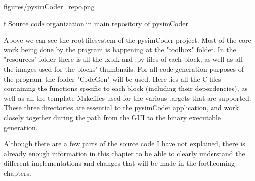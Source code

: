 \medskip {}
\picw=12cm \cinspic figures/pysimCoder_repo.png
\caption/f Source code organization in main repository of pysimCoder
\medskip

\quad Above we can see the root filesystem of the pysimCoder project. Most of the core work being done by the program is
happening at the "toolbox" folder. In the "resources" folder there is all the .xblk and .py files of each block, as well as
all the images used for the blocks' thumbnails. For all code generation purposes of the program, the folder "CodeGen" will be
used. Here lies all the C files containing the functions specific to each block (including their dependencies), as well
as all the template Makefiles used for the various targets that are supported. These three directories are essential to the
pysimCoder application, and work closely together during the path from the GUI to the binary executable generation.

\quad Although there are a few parts of the source code I have not explained, there is already enough information
in this chapter to be able to clearly understand the different implementations and changes that will be made in the 
forthcoming chapters. 

